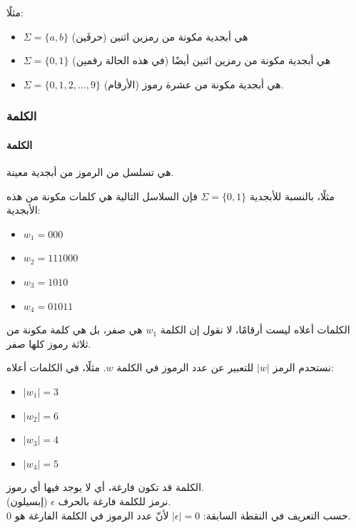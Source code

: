 \documentclass[12pt]{article}
\begin{document}
مثلًا:
\begin{itemize}
    \item $\Sigma = \{a, b\}$ هي أبجدية مكونة من رمزين اثنين (حرفَين)
    \item $\Sigma = \{0, 1\}$ هي أبجدية مكونة من رمزين اثنين أيضًا (في هذه الحالة رقمين)
    \item $\Sigma = \{0, 1, 2, \dots, 9\}$ هي أبجدية مكونة من عشرة رموز (الأرقام).
\end{itemize}


\subsubsection{الكلمة}

\paragraph{الكلمة} هي تسلسل من الرموز من أبجدية معينة.

مثلًا، بالنسبة للأبجدية $\Sigma = \{0, 1\}$ فإن السلاسل التالية هي كلمات مكونة من هذه الأبجدية:
\begin{itemize}
    \item $w_1 = 000$
    \item $w_2 = 111000$
    \item $w_3 = 1010$
    \item $w_4 = 01011$
\end{itemize}

\begin{attention}
    الكلمات أعلاه ليست أرقامًا، لا نقول إن الكلمة $w_1$ هي صفر، بل هي كلمة مكونة من ثلاثة رموز كلها صفر.
\end{attention}

نستحدم الرمز $|w|$ للتعبير عن عدد الرموز في الكلمة $w$.
مثلًا، في الكلمات أعلاه:
\begin{itemize}
    \item $|w_1| = 3$
    \item $|w_2| = 6$
    \item $|w_3| = 4$
    \item $|w_4| = 5$
\end{itemize}

\begin{attention}
    الكلمة قد تكون فارغة، أي لا يوجد فيها أي رموز. \\
    نرمز للكلمة فارغة بالحرف $\epsilon$ (إبسيلون). \\
    حسب التعريف في النقطة السابقة: $|\epsilon| = 0$ لأنّ عدد الرموز في الكلمة الفارغة هو 0.
\end{attention}
\end{document}
